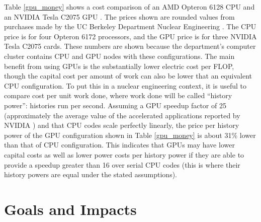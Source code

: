 Table \ref{gpu_money} shows a cost comparison of an AMD Opteron 6128 CPU and an NVIDIA Tesla C2075 GPU \cite{cpu_latency,cuda}.  The prices shown are rounded values from purchases made by the UC Berkeley Department Nuclear Engineering \cite{cost_sheets1,cost_sheets2}.  The CPU price is for four Opteron 6172 processors, and the GPU price is for three NVIDIA Tesla C2075 cards.  These numbers are shown because the department's computer cluster contains CPU and GPU nodes with these configurations.  The main benefit from using GPUs is the substantially lower electric cost per FLOP, though the capital cost per amount of work can also be lower that an equivalent CPU configuration.  To put this in a nuclear engineering context, it is useful to compare cost per unit work done, where work done will be called ``history power'': histories run per second.  Assuming a GPU speedup factor of 25 (approximately the average value of the accelerated applications reported by NVIDIA \cite{nvidia_speedups}) and that CPU codes scale perfectly linearly, the price per history power of the GPU configuration shown in Table \ref{gpu_money} is about 31\% lower than that of CPU configuration.  This indicates that GPUs may have lower capital costs as well as lower power costs per history power if they are able to provide a speedup greater than 16 over serial CPU codes (this is where their history powers are equal under the stated assumptions). 

\section{Goals and Impacts}

